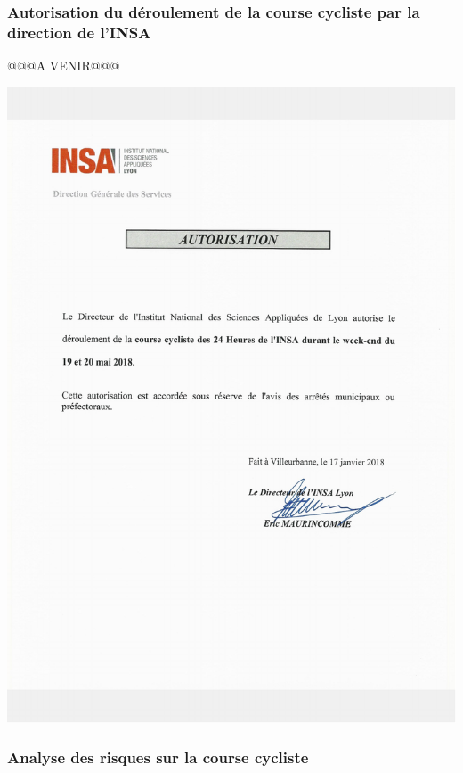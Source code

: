 \documentclass[hidelinks, paper=a4, fontsize=13pt]{report}
\begin{document}
\subsubsection{Autorisation du déroulement de la course cycliste par la direction de l’INSA}
@@@A VENIR@@@
\begin{center}
\includegraphics[scale=0.72]{Annexes/Documents/INSAAutorisationCourseCycliste}
\end{center}

\subsubsection{Analyse des risques sur la course cycliste}
\end{document}
